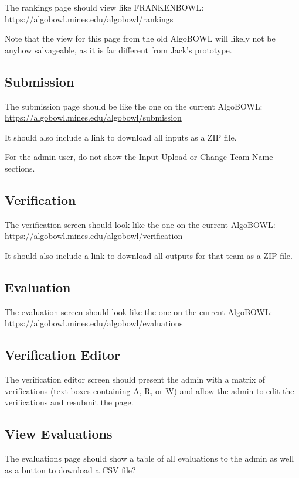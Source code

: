 \documentclass[12pt]{article}
\begin{document}
The rankings page should view like FRANKENBOWL: \\
\url{https://algobowl.mines.edu/algobowl/rankings}

Note that the view for this page from the old AlgoBOWL will likely not be
anyhow salvageable, as it is far different from Jack's prototype.

\subsection{Submission}

The submission page should be like the one on the current AlgoBOWL: \\
\url{https://algobowl.mines.edu/algobowl/submission}

It should also include a link to download all inputs as a ZIP file.

For the admin user, do not show the Input Upload or Change Team Name sections.

\subsection{Verification}

The verification screen should look like the one on the current AlgoBOWL: \\
\url{https://algobowl.mines.edu/algobowl/verification}

It should also include a link to download all outputs for that team as a ZIP
file.

\subsection{Evaluation}

The evaluation screen should look like the one on the current AlgoBOWL: \\
\url{https://algobowl.mines.edu/algobowl/evaluations}

\subsection{Verification Editor}

The verification editor screen should present the admin with a matrix of
verifications (text boxes containing A, R, or W) and allow the admin to edit
the verifications and resubmit the page.

\subsection{View Evaluations}

The evaluations page should show a table of all evaluations to the admin as
well as a button to download a CSV file?
\end{document}
